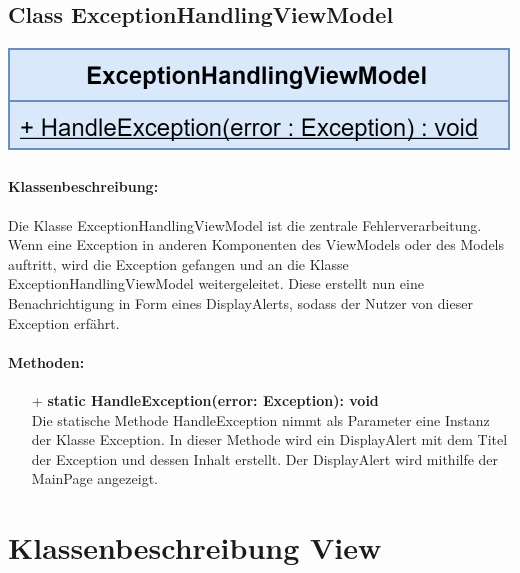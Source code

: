 \documentclass[a4paper,12pt]{article}
\begin{document}
	\subsection{Class ExceptionHandlingViewModel}

	\includegraphics{bilder/ViewmodelKlassen/ExceptionHandlingViewModelClass.png}

	\paragraph{Klassenbeschreibung:}
	Die Klasse ExceptionHandlingViewModel ist die zentrale Fehlerverarbeitung. Wenn eine Exception in anderen Komponenten des ViewModels oder des Models auftritt, wird die Exception gefangen und an die Klasse ExceptionHandlingViewModel weitergeleitet. Diese erstellt nun eine Benachrichtigung in Form eines DisplayAlerts, sodass der Nutzer von dieser Exception erfährt. 
	
	\paragraph{Methoden:}
	\begin{itemize}
		\item[+] \textbf{static HandleException(error: Exception): void}\\Die statische Methode HandleException nimmt als Parameter eine Instanz der Klasse Exception. In dieser Methode wird ein DisplayAlert mit dem Titel der Exception und dessen Inhalt erstellt. Der DisplayAlert wird mithilfe der MainPage angezeigt.
	\end{itemize}
\section{Klassenbeschreibung View}
\end{document}
